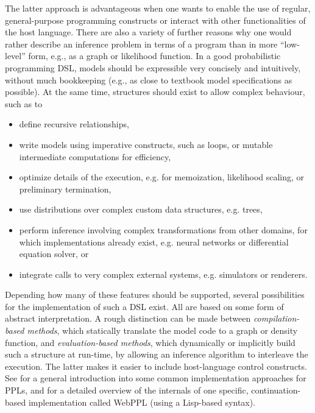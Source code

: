 The latter approach is advantageous when one wants to enable the use of regular, general-purpose
programming constructs or interact with other functionalities of the host language.  There are also
a variety of further reasons why one would rather describe an inference problem in terms of a
program than in more \enquote{low-level} form, e.g., as a graph or likelihood function.  In a good
probabilistic programming DSL, models should be expressible very concisely and intuitively, without
much bookkeeping (e.g., as close to textbook model specifications as possible).  At the same time,
structures should exist to allow complex behaviour, such as to
\begin{itemize}
\item define recursive relationships,
\item write models using imperative constructs, such as loops, or mutable intermediate computations
  for efficiency,
\item optimize details of the execution, e.g. for memoization, likelihood scaling, or preliminary
  termination,
\item use distributions over complex custom data structures, e.g. trees,
\item perform inference involving complex transformations from other domains, for which
  implementations already exist, e.g. neural networks or differential equation solver, or
\item integrate calls to very complex external systems, e.g. simulators or renderers.
\end{itemize}
Depending how many of these features should be supported, several possibilities for the
implementation of such a DSL exist.  All are based on some form of abstract interpretation.  A rough
distinction can be made between \emph{compilation-based methods}, which statically translate the
model code to a graph or density function, and \emph{evaluation-based methods}, which dynamically or
implicitly build such a structure at run-time, by allowing an inference algorithm to interleave the
execution.  The latter makes it easier to include host-language control constructs.  See
\textcite{vandemeent2018introduction} for a general introduction into some common implementation
approaches for PPLs, and \textcite{goodman2014design} for a detailed overview of the internals of
one specific, continuation-based implementation called WebPPL (using a Lisp-based syntax).

